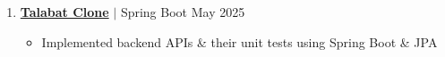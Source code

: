 \documentclass[a4paper,11pt]{article}
\begin{document}
\begin{enumerate}


    \item \href{https://github.com/hosain-ghoraba/Talabat-Backend-Clone/tree/main} {\textbf{\color[rgb]{0,0,1} Talabat Clone}} $|$ {Spring Boot} \hfill {May 2025}
    \   \begin{itemize}
            \item Implemented backend APIs \& their unit tests using Spring Boot \& JPA
        \end{itemize}


 




\end{enumerate}
\end{document}
